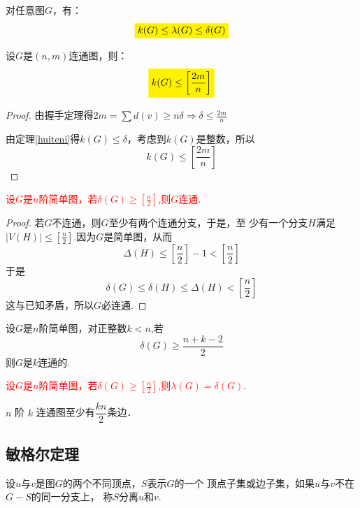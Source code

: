 \begin{theorem}[惠特尼1932]
	\label{huiteni}
	对任意图$G$，有：
	\[
	\colorbox{yellow}{$k(G)\leq \lambda(G) \leq \delta(G)$}
	\]
\end{theorem}


\begin{theorem}
	设$G$是$(n, m)$连通图，则：
	\[
	\colorbox{yellow}{$k(G)\leq \left[\dfrac{2m}{n}\right]$}
	\]
\end{theorem}
\begin{proof}
	由握手定理得$2m = \sum d(v) \geq n \delta \Rightarrow \delta \leq \frac{2m}{n}$
	
	由定理\ref{huiteni}得$k(G)\leq \delta$，考虑到$k(G)$是整数，所以
	\[
		k(G)\leq \left[\frac{2m}{n}\right]
	\]
\end{proof}


\begin{lemma}
	\textcolor{red}{设$G$是$n$阶简单图，若$\delta(G)\geq\left[\frac{n}{2}\right]$,则$G$连通}.
\end{lemma}
\begin{proof}
	若$G$不连通，则$G$至少有两个连通分支，于是，至
	少有一个分支$H$满足$|V(H)|\leq \left[\frac{n}{2}\right]$.因为$G$是简单图，从而
	\[
	\varDelta(H) \leq \left[\dfrac{n}{2}\right]-1  <\left[\dfrac{n}{2}\right]
	\]
	于是
	\[
	\delta(G) \leq \delta(H)\leq \varDelta(H) < \left[\frac{n}{2}\right]
	\]
这与已知矛盾，所以$G$必连通.
\end{proof}

\begin{theorem}
		设$G$是$n$阶简单图，对正整数$k< n$,若
	\[
	\delta(G)\geq \dfrac{n+k-2}{2}
	\]则$G$是$k$连通的.
\end{theorem}
\begin{theorem}
		\textcolor{red}{设$G$是$n$阶简单图，若$\delta(G)\geq\left[\frac{n}{2}\right]$,则$\lambda(G)=\delta(G)$}.
\end{theorem}


\begin{example}
	 $n$ 阶 $k$ 连通图至少有$\dfrac{kn}{2}$条边．
\end{example}

\subsection{敏格尔定理}
\begin{definition}
设$u$与$v$是图$G$的两个不同顶点，$S$表示$G$的一个
顶点子集或边子集，如果$u$与$v$不在$G-S$的同一分支上，
称$S$分离$u$和$v$.
\end{definition}


